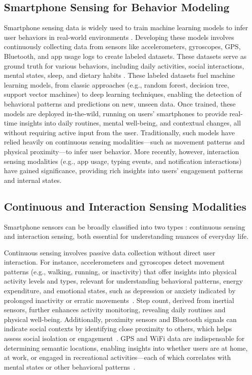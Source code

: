 \subsection{Smartphone Sensing for Behavior Modeling}

Smartphone sensing data is widely used to train machine learning models to infer user behaviors in real-world environments \cite{meegahapola2020smartphone}. Developing these models involves continuously collecting data from sensors like accelerometers, gyroscopes, GPS, Bluetooth, and app usage logs to create labeled datasets. These datasets serve as ground truth for various behaviors, including daily activities, social interactions, mental states, sleep, and dietary habits \cite{meegahapola2020smartphone}. These labeled datasets fuel machine learning models, from classic approaches (e.g., random forest, decision tree, support vector machines) to deep learning techniques, enabling the detection of behavioral patterns and predictions on new, unseen data. Once trained, these models are deployed in-the-wild, running on users' smartphones to provide real-time insights into daily routines, mental well-being, and contextual changes, all without requiring active input from the user. Traditionally, such models have relied heavily on continuous sensing modalities—such as movement patterns and physical proximity—to infer user behavior. More recently, however, interaction sensing modalities (e.g., app usage, typing events, and notification interactions) have gained significance, providing rich insights into users’ engagement patterns and internal states.

\subsection{Continuous and Interaction Sensing Modalities} Smartphone sensors can be broadly classified into two types \cite{meegahapola2020smartphone}: continuous sensing and interaction sensing, both essential for understanding nuances of everyday life.

Continuous sensing involves passive data collection without direct user interaction. For instance, accelerometers and gyroscopes detect movement patterns (e.g., walking, running, or inactivity) that offer insights into physical activity levels and types, relevant for understanding behavioral patterns, energy expenditure, and emotional states, such as depression or anxiety indicated by prolonged inactivity or erratic movements~\cite{elhai2018depression, canzian2015trajectories}. Step count, derived from inertial sensors, further enhances activity monitoring, revealing daily routines and physical well-being. Additionally, proximity sensors and Bluetooth signals can indicate social contexts by identifying close proximity to others, which helps assess social isolation or engagement~\cite{meegahapola2020smartphone, lane2010survey}. GPS and WiFi data are indispensable for determining semantic locations, enabling insights into whether users are at home, at work, or engaged in recreational activities—each of which correlates with mental states or other behavioral patterns~\cite{santani2018drinksense, meegahapola2023generalization, servia2017mobile}.


